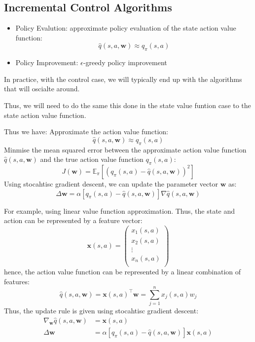 \subsection{Incremental Control Algorithms}
\begin{itemize}
    \item Policy Evalution: approximate policy evaluation of the state action value function:
    \[
        \hat{q}(s,a,\mathbf{w}) \approx q_{\pi}(s,a)
    \]
    \item Policy Improvement: \(\epsilon\)-greedy policy improvement 
\end{itemize}
In practice, with the control case, we will typically end up with the algorithms that will 
oscialte around.

Thus, we will need to do the same this done in the state value funtion case to the state
action value function.

Thus we have:
Approximate the action value function:
\[
    \hat{q}(s,a,\mathbf{w}) \approx q_{\pi}(s,a)  
\]    
Minmise the mean squared error between the approximate action value function \(\hat{q}(s,a,
\mathbf{w})\) and the true action value function \(q_{\pi}(s,a)\):
\[
    J(\mathbf{w}) = \mathbb{E}_{\pi}\left[ 
        \left( q_{\pi}(s,a) - \hat{q}(s,a,\mathbf{w}) \right)^2
     \right] 
\]
Using stocahtisc gradient descent, we can update the parameter vector \(\mathbf{w}\) as:
\[
\Delta \mathbf{w} = \alpha \left[ 
    q_{\pi}(s,a) - \hat{q}(s,a,\mathbf{w})
 \right] \nabla \hat{q}(s,a,\mathbf{w})
\]

For example, using linear value function approximation. Thus, the state and action can be
represented by a feature vector:
\[
    \mathbf{x}(s,a) = \begin{pmatrix}
        x_1(s,a) \\
        x_2(s,a) \\
        \vdots \\
        x_n(s,a) \\
    \end{pmatrix}  
\]
hence, the action value function can be represented by a linear combination of features:
\[
    \hat{q}(s,a,\mathbf{w}) = \mathbf{x}(s,a)^{\top} \mathbf{w} = \sum_{j=1}^{n} x_j(s,a) w_j
\]
Thus, the update rule is given using stocahtisc gradient descent:
\[
\begin{aligned}
    \nabla_{\mathbf{w}} \hat{q}(s,a,\mathbf{w}) &= \mathbf{x}(s,a) \\
    \Delta \mathbf{w} &= \alpha \left[ 
        q_{\pi}(s,a) - \hat{q}(s,a,\mathbf{w})
     \right] \mathbf{x}(s,a)
\end{aligned}
\]

